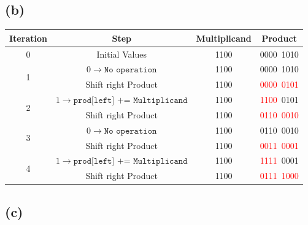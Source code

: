 \documentclass[12pt]{article}
\begin{document}
\subsection*{(b)}

\begin{table}[h!]
    \centering
    \begin{tabular}{|c|c|c|c|}
    \hline
    \textbf{Iteration} & \textbf{Step} & \textbf{Multiplicand} & \textbf{Product}  \\
     \hline
        0 & Initial Values & 1100 & 0000\ 1010 \\
        \hline
        \multirow{2}{*}{1} 
         & $0\rightarrow\texttt{No operation}$ & 1100 & 0000\ 1010 \\
        \cline{2-4}
         & Shift right Product & 1100 & \textcolor{red}{0000\ 0101} \\
        \hline
        \multirow{2}{*}{2}
         & $1\rightarrow\texttt{prod[left] += Multiplicand}$ & 1100 & \textcolor{red}{1100}\ 0101  \\
        \cline{2-4}
         & Shift right Product & 1100 & \textcolor{red}{0110\ 0010} \\
        \hline
        \multirow{2}{*}{3}
         & $0\rightarrow\texttt{No operation}$ & 1100 & 0110\ 0010 \\
        \cline{2-4}
         & Shift right Product & 1100 & \textcolor{red}{0011\ 0001} \\
        \hline
        \multirow{2}{*}{4}
         & $1\rightarrow\texttt{prod[left] += Multiplicand}$ & 1100 & \textcolor{red}{1111}\ 0001 \\
        \cline{2-4}
         & Shift right Product & 1100 & \textcolor{red}{0111\ 1000} \\
        \hline
        \end{tabular}
\end{table}

\clearpage

\subsection*{(c)}
\end{document}
